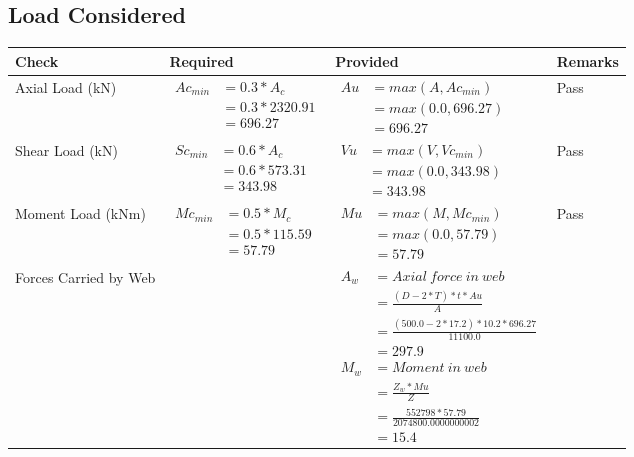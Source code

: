 \documentclass{article}%
\begin{document}
\subsection{Load Considered}%
\label{subsec:LoadConsidered}%
\renewcommand{\arraystretch}{1.2}%
\begin{longtable}{|p{4cm}|p{5cm}|p{5.5cm}|p{1.5cm}|}%
\hline%
\rowcolor{OsdagGreen}%
Check&Required&Provided&Remarks\\%
\hline%
\endhead%
\hline%
Axial Load (kN)&$\begin{aligned} Ac_{min} &= 0.3 * A_c\\ &= 0.3 *2320.91\\ &=696.27\end{aligned}$&$\begin{aligned} Au &= max(A,Ac_{min} )\\ &= max( 0.0,696.27)\\ &=696.27\end{aligned}$&Pass\\%
\hline%
Shear Load (kN)&$\begin{aligned} Sc_{min} &= 0.6 * A_c\\ &= 0.6 *573.31\\ &=343.98\end{aligned}$&$\begin{aligned} Vu &= max(V,Vc_{min})\\ &=  max(0.0,343.98)\\ &=343.98\end{aligned}$&Pass\\%
\hline%
Moment Load (kNm)&$\begin{aligned} Mc_{min} &= 0.5 * M_c\\ &= 0.5 *115.59\\ &=57.79\end{aligned}$&$\begin{aligned} Mu &= max(M,Mc_{min} )\\ &= max(0.0,57.79)\\ &=57.79\end{aligned}$&Pass\\%
\hline%
Forces Carried by Web&&$\begin{aligned}A_w &= Axial~ force~ in~ web  \\   &= \frac{(D- 2*T)*t* Au }{A} \\ &= \frac{(500.0- 2*17.2)*10.2*696.27 }{11100.0} \\ &=297.9\\ M_w &= Moment ~in ~web  \\  &= \frac{Z_w * Mu}{Z} \\ &= \frac{552798 * 57.79}{2074800.0000000002} \\ &=15.4\end{aligned}$&\\%

\end{longtable}
\end{document}
